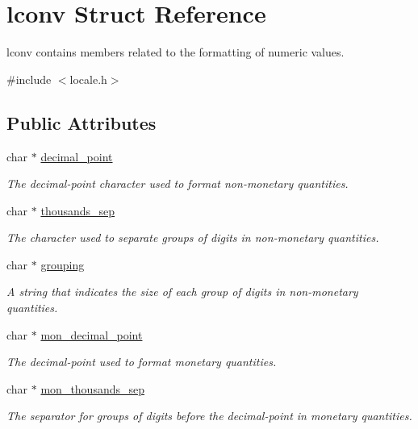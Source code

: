 \hypertarget{structlconv}{}\section{lconv Struct Reference}
\label{structlconv}


lconv contains members related to the formatting of numeric values.  




{\ttfamily \#include $<$locale.\+h$>$}

\subsection*{Public Attributes}
\begin{DoxyCompactItemize}
\item 
char $\ast$ \mbox{\hyperlink{structlconv_a445e27fc7f797c8cca97b381f062fb60}{decimal\+\_\+point}}
\begin{DoxyCompactList}\small\item\em The decimal-\/point character used to format non-\/monetary quantities. \end{DoxyCompactList}\item 
char $\ast$ \mbox{\hyperlink{structlconv_aede8dfaac91d7b4e6b7fb0d96184d74d}{thousands\+\_\+sep}}
\begin{DoxyCompactList}\small\item\em The character used to separate groups of digits in non-\/monetary quantities. \end{DoxyCompactList}\item 
char $\ast$ \mbox{\hyperlink{structlconv_a46e468755a823be50de20f36be5ff2be}{grouping}}
\begin{DoxyCompactList}\small\item\em A string that indicates the size of each group of digits in non-\/monetary quantities. \end{DoxyCompactList}\item 
char $\ast$ \mbox{\hyperlink{structlconv_a1aa08afe707c1d5d40b4d01369176480}{mon\+\_\+decimal\+\_\+point}}
\begin{DoxyCompactList}\small\item\em The decimal-\/point used to format monetary quantities. \end{DoxyCompactList}\item 
char $\ast$ \mbox{\hyperlink{structlconv_a4f04f4fd9ea670d21fc76fb5c77c032d}{mon\+\_\+thousands\+\_\+sep}}
\begin{DoxyCompactList}\small\item\em The separator for groups of digits before the decimal-\/point in monetary quantities. \end{DoxyCompactList}\item 

\end{DoxyCompactItemize}
